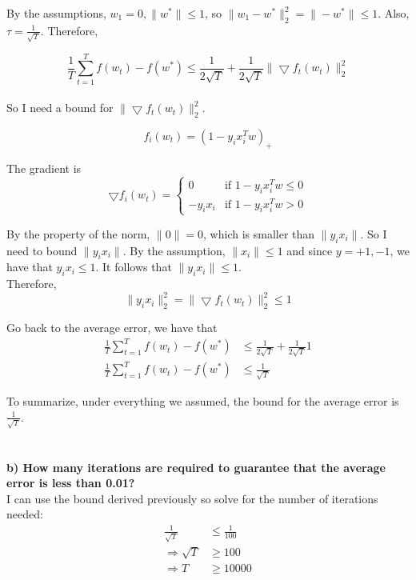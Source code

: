 \documentclass[paper=a4, fontsize=11pt]{scrartcl} %
\numberwithin{equation}{section} %
\numberwithin{figure}{section} %
\numberwithin{table}{section} %
\begin{document}
By the assumptions, $w_1 = 0, \|w^*\| \leq 1$, so $\| w_1 - w^*\|_2^2 = \|-w^*\| \leq 1$. Also, $\tau = \frac{1}{\sqrt{T}}$. Therefore,

$$
\frac{1}{T} \sum_{t=1}^{T} f(w_{t}) - f(w^*) 
\leq \frac{1}{2 \sqrt{T}} + \frac{1}{2 \sqrt{T}} \| \bigtriangledown f_t(w_t) \|_2^2
$$\\

So I need a bound for $\| \bigtriangledown f_t(w_t) \|_2^2$. 

$$
f_i(w_t) = (1 - y_i x_i^T w)_+
$$

The gradient is 
\[
\bigtriangledown f_i(w_t) = 
\begin{cases}
0 				& \text{if } 1 - y_i x_i^T w \leq 0 \\
-y_i x_i          & \text{if } 1 - y_i x_i^T w > 0 
\end{cases}
\]

By the property of the norm, $\| 0 \| = 0 $, which is smaller than $\|y_i x_i\|$. So I need to bound $\|y_i x_i\|$. By the assumption, $\|x_i\| \leq 1 $ and since $y = {+1, -1}$, we have that $y_i x_i \leq 1 $. It follows that $\|y_i x_i\| \leq 1 $. \\
Therefore, 
$$
\|y_i x_i\|_2^2 = \| \bigtriangledown f_t(w_t) \|_2^2 \leq 1
$$

Go back to the average error, we have that 
\begin{align*}
\frac{1}{T} \sum_{t=1}^{T} f(w_{t}) - f(w^*) 
& \leq \frac{1}{2 \sqrt{T}} + \frac{1}{2 \sqrt{T}} 1	\\
\frac{1}{T} \sum_{t=1}^{T} f(w_{t}) - f(w^*) 
& \leq \frac{1}{\sqrt{T}}
\end{align*}

To summarize, under everything we assumed, the bound for the average error is $\frac{1}{\sqrt{T}}$.\\\\\\

\textbf{b) How many iterations are required to guarantee that the average error is less than 0.01?}\\

I can use the bound derived previously so solve for the number of iterations needed:  
\begin{align*}
\frac{1}{\sqrt{T}} & \leq \frac{1}{100}	\\
\Rightarrow \sqrt{T} & \geq 100	\\
\Rightarrow T & \geq 10000
\end{align*}
\end{document}

